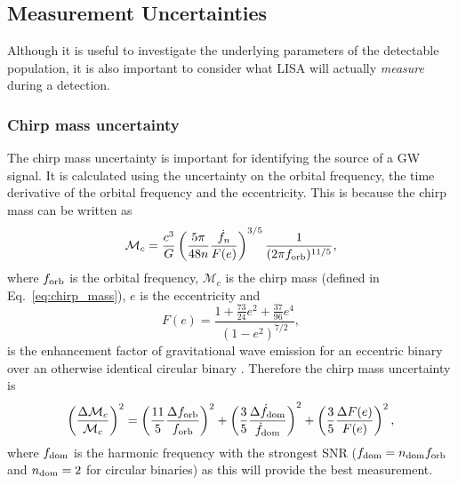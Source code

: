 \subsection{Measurement Uncertainties}\label{sec:measurement_uncertainties}
Although it is useful to investigate the underlying parameters of the detectable population, it is also important to consider what LISA will actually \textit{measure} during a detection.

\subsubsection{Chirp mass uncertainty}

The chirp mass uncertainty is important for identifying the source of a GW signal. It is calculated using the uncertainty on the orbital frequency, the time derivative of the orbital frequency and the eccentricity. This is because the chirp mass can be written as
\begin{equation}
    \mathcal{M}_c = \frac{c^3}{G} \left( \frac{5 \pi}{48 n} \frac{\dot{f}_{n}}{F(e)} \right)^{3/5} \frac{1}{(2 \pi f_{\rm orb})^{11/5}},
\end{equation}
where $f_{\rm orb}$ is the orbital frequency, $\mathcal{M}_{c}$ is the chirp mass (defined in Eq.~\ref{eq:chirp_mass}), $e$ is the eccentricity and
\begin{equation}
    F(e) = \frac{1 + \frac{73}{24} e^2 + \frac{37}{96} e^4}{(1 - e^2)^{7/2}},
\end{equation}
is the enhancement factor of gravitational wave emission for an eccentric binary over an otherwise identical circular binary \citep[][Eq.~17]{Peters+1963}. Therefore the chirp mass uncertainty is
\begin{equation}\label{eq:chirp_mass_uncertainty}
    \qty( \frac{\Delta \mathcal{M}_c}{\mathcal{M}_c} )^2 = \left( \frac{11}{5} \frac{\Delta f_{\rm orb}}{f_{\rm orb}} \right)^2 + \left( \frac{3}{5} \frac{\Delta \dot{f}_{\rm dom}}{\dot{f}_{\rm dom}} \right)^2 + \left( \frac{3}{5} \frac{\Delta F(e)}{F(e)} \right)^2,
\end{equation}
where $f_{\rm dom}$ is the harmonic frequency with the strongest SNR ($f_{\rm dom} = n_{\rm dom} f_{\rm orb}$ and $n_{\rm dom} = 2$ for circular binaries) as this will provide the best measurement.

